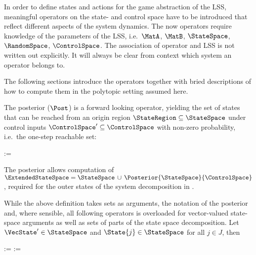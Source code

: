 In order to define states and actions for the game abstraction of the LSS, meaningful operators on the state- and control space have to be introduced that reflect different aspects of the system dynamics.
The now operators require knowledge of the parameters of the LSS, i.e.\ $\MatA$, $\MatB$, $\StateSpace$, $\RandomSpace$, $\ControlSpace$.
The association of operator and LSS is not written out explicitly.
It will always be clear from context which system an operator belongs to.

The following sections introduce the operators together with bried descriptions of how to compute them in the polytopic setting assumed here.



\startsubsection[title={Posterior}]

    The posterior ($\Post$) is a forward looking operator, yielding the set of states that can be reached from an origin region $\StateRegion \subseteq \StateSpace$ under control inputs $\ControlSpace' \subseteq \ControlSpace$ with non-zero probability, i.e.\ the one-step reachable set:

    \startformula
        \Posterior{\StateRegion}{\ControlRegion} :=  \EndPeriod
    \stopformula

    The posterior allows computation of $\ExtendedStateSpace = \StateSpace \,\cup\, \Posterior{\StateSpace}{\ControlSpace}$, required for the outer states of the system decomposition in .

    While the above definition takes sets as arguments, the notation of the posterior and, where sensible, all following operators is overloaded for vector-valued state-space arguments as well as sets of parts of the state space decomposition.
    Let $\VecState' \in \StateSpace$ and $\State{j} \in \StateSpace$ for all $j \in J$, then

    \startformula
        \startalign[n=2,align={right,left}]
            \NC {} :=
            \NC {} \EndAnd
            \NR
            \NC {} :=
            \NC {} \EndPeriod
            \NR
        \stopalign
    \stopformula

